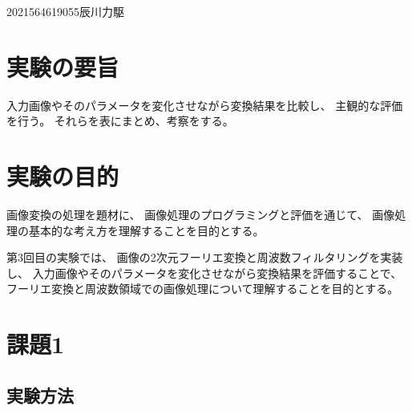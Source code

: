 \documentclass[12pt]{jarticle}
\begin{document}
{2021}{5}{6}{4619055}{辰川力駆}
\section{実験の要旨}

入力画像やそのパラメータを変化させながら変換結果を比較し、
主観的な評価を行う。
それらを表にまとめ、考察をする。

\section{実験の目的}

画像変換の処理を題材に、
画像処理のプログラミングと評価を通じて、
画像処理の基本的な考え方を理解することを目的とする。

第3回目の実験では、
画像の2次元フーリエ変換と周波数フィルタリングを実装し、
入力画像やそのパラメータを変化させながら変換結果を評価することで、
フーリエ変換と周波数領域での画像処理について理解することを目的とする。

\section{課題1}
\subsection{実験方法}
\end{document}
